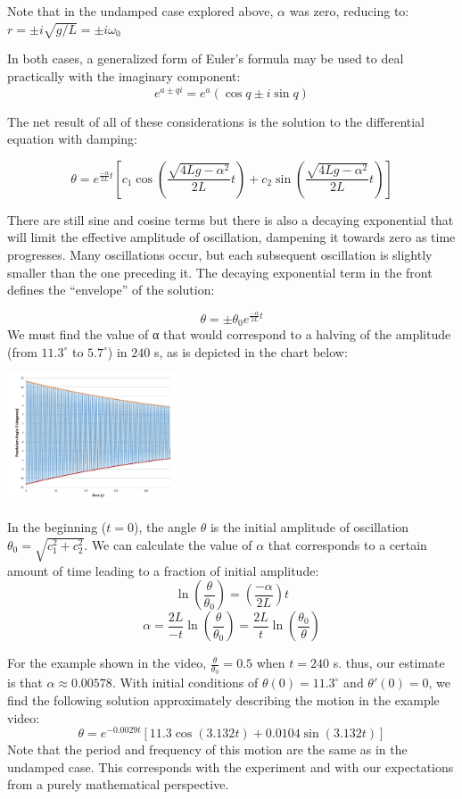 \documentclass{ximera}
\begin{document}
Note that in the undamped case explored above, $\alpha$ was zero, reducing to:
$r=\pm i\sqrt{g/L}=\pm i\omega_0$

In both cases, a generalized form of Euler’s formula may be used to deal practically with the imaginary component:
$$e^{a\pm qi}=e^{a}(\cos q\pm i\sin q)$$

The net result of all of these considerations is the solution to the differential equation with damping:

$$\theta=e^{\frac{-\alpha}{2L}t}\left[c_1\cos \left(\frac{\sqrt{4Lg-\alpha^2}}{2L}t\right)+c_2\sin\left(\frac{\sqrt{4Lg-\alpha^2}}{2L}t\right)\right]$$

There are still sine and cosine terms but there is also a decaying exponential that will limit the effective amplitude of oscillation, dampening it towards zero as time progresses.  Many oscillations occur, but each subsequent oscillation is slightly smaller than the one preceding it.  The decaying exponential term in the front defines the “envelope” of the solution: 

$$\theta=\pm\theta_0 e^{\frac{-\alpha}{2L}t}$$
We must find the value of α that would correspond to a halving of the amplitude (from $11.3^\circ$ to $5.7^\circ$) in $240$ s, as is depicted in the chart below: 
\begin{image}
 \includegraphics[height=1.5in]{simplePendulum.jpg}
\end{image}
In the beginning ($t=0$), the angle $\theta$ is the initial amplitude of oscillation $\theta_0=\sqrt{c_1^2+c_2^2}$.  We can calculate the value of $\alpha$ that corresponds to a certain amount of time leading to a fraction of initial amplitude:
$$\ln\left(\frac{\theta}{\theta_0}\right)=\left(\frac{-\alpha}{2L}\right)t$$
$$\alpha=\frac{2L}{-t}\ln\left(\frac{\theta}{\theta_0}\right)=\frac{2L}{t}\ln\left(\frac{\theta_0}{\theta}\right)$$

For the example shown in the video, $\frac{\theta}{\theta_0}=0.5$ when $t=240$ s.  thus, our estimate is that $\alpha\approx 0.00578$.  With initial conditions of $\theta (0)=11.3^\circ$ and $\theta'(0)=0$, we find the following solution approximately describing the motion in the example video:
$$\theta=e^{-0.0029t}\left[11.3\cos(3.132t)+0.0104\sin(3.132t)\right]$$
Note that the period and frequency of this motion are the same as in the undamped case.  This corresponds with the experiment and with our expectations from a purely mathematical perspective.  
\end{document}
